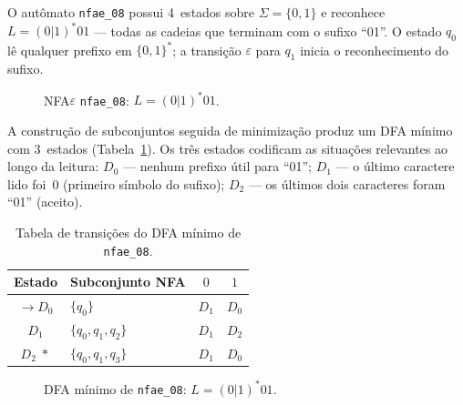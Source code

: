 \documentclass[sumario=abnt-6027-2012]{ifes8}
\begin{document}
O autômato \texttt{nfae\_08} possui 4~estados sobre $\Sigma = \{0,1\}$ e
reconhece $L = (0|1)^*01$ — todas as cadeias que terminam com o sufixo
``01''. O estado $q_0$ lê qualquer prefixo em $\{0,1\}^*$; a transição
$\varepsilon$ para $q_1$ inicia o reconhecimento do sufixo.

\begin{figure}[H]
  \centering
  \caption{NFA$\varepsilon$ \texttt{nfae\_08}: $L = (0|1)^*01$.}
  \label{fig:nfae08-nfae}
\end{figure}

A construção de subconjuntos seguida de minimização produz um DFA mínimo
com 3~estados (Tabela~\ref{tab:nfae08-trans}). Os três estados codificam as
situações relevantes ao longo da leitura: $D_0$ — nenhum prefixo útil para
``01''; $D_1$ — o último caractere lido foi~$0$ (primeiro símbolo do
sufixo); $D_2$ — os últimos dois caracteres foram ``01'' (aceito).

\begin{table}[H]
  \centering
  \caption{Tabela de transições do DFA mínimo de \texttt{nfae\_08}.}
  \label{tab:nfae08-trans}
  \renewcommand{\arraystretch}{1.2}
  \begin{tabular}{clcc}
    \toprule
    \textbf{Estado} & \textbf{Subconjunto NFA} & $0$ & $1$ \\
    \midrule
    $\to D_0$ & $\{q_0\}$           & $D_1$ & $D_0$ \\
    $D_1$     & $\{q_0,q_1,q_2\}$  & $D_1$ & $D_2$ \\
    $D_2\;*$  & $\{q_0,q_1,q_3\}$  & $D_1$ & $D_0$ \\
    \bottomrule
  \end{tabular}
\end{table}

\begin{figure}[H]
  \centering
  \caption{DFA mínimo de \texttt{nfae\_08}: $L = (0|1)^*01$.}
  \label{fig:nfae08-dfa}
\end{figure}
\end{document}
